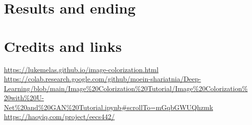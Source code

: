 \documentclass{article}
\begin{document}
\section{Results and ending}


\section{Credits and links}
\url{https://lukemelas.github.io/image-colorization.html} \\ 
\url{https://colab.research.google.com/github/moein-shariatnia/Deep-Learning/blob/main/Image%20Colorization%20Tutorial/Image%20Colorization%20with%20U-Net%20and%20GAN%20Tutorial.ipynb#scrollTo=mGqbGWUQhzmk}
\url{https://haoyiq.com/project/eecs442/} \\ 
\end{document}
